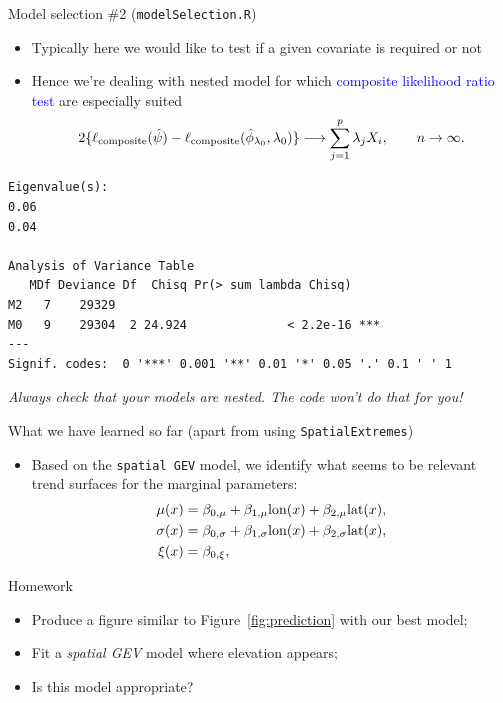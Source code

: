 \documentclass[blackslide,style=simple]{powerdot}
\theoremstyle{plain}%
\theoremstyle{definition}
\theoremstyle{remark}
\newcommand{\advice}[1]{\HandPencilLeft{} \emph{#1}}
\begin{document}
\begin{slide}[toc=Model selection \#2,method=direct]{Model selection \#2
    (\texttt{modelSelection.R})}
  \begin{itemize}
  \item Typically here we would like to test if a given covariate is
    required or not
  \item Hence we're dealing with nested model for which
    \textcolor{blue}{composite likelihood ratio test} are especially
    suited
    \begin{equation*}
      2 \{\ell_{\rm composite}(\hat \psi) - \ell_{\rm composite}(\hat
      \phi_{\lambda_0}, \lambda_0)\} \longrightarrow \sum_{j=1}^p
      \lambda_j X_i, \qquad n \to \infty.
    \end{equation*}
  \end{itemize}
{\tiny
\begin{verbatim}
Eigenvalue(s):
0.06
0.04

Analysis of Variance Table
   MDf Deviance Df  Chisq Pr(> sum lambda Chisq)    
M2   7    29329                                     
M0   9    29304  2 24.924              < 2.2e-16 ***
---
Signif. codes:  0 '***' 0.001 '**' 0.01 '*' 0.05 '.' 0.1 ' ' 1
\end{verbatim}  
}
\advice{Always check that your models are nested. The code won't do
  that for you!}
\end{slide}

\begin{slide}[toc=Debrief \#3]{What we have learned so far (apart from
    using \texttt{SpatialExtremes})}
  \begin{itemize}
  \item Based on the \texttt{spatial GEV} model, we identify what
    seems to be relevant trend surfaces for the marginal parameters:
    \begin{align*}
      \mu(x) &= \beta_{0,\mu} + \beta_{1, \mu} {\rm lon}(x) + \beta_{2,
        \mu} {\rm lat}(x),\\
      \sigma(x) &= \beta_{0,\sigma} + \beta_{1, \sigma} {\rm lon}(x) + \beta_{2,
        \sigma} {\rm lat}(x),\\
      \xi(x) &= \beta_{0,\xi},
    \end{align*}
  \end{itemize}  
\end{slide}

\begin{slide}{Homework}
  \begin{itemize}
  \item Produce a figure similar to Figure~\ref{fig:prediction} with
    our best model;
  \item Fit a \emph{spatial GEV} model where elevation appears;
  \item Is this model appropriate?
  \end{itemize}  
\end{slide}
\end{document}
